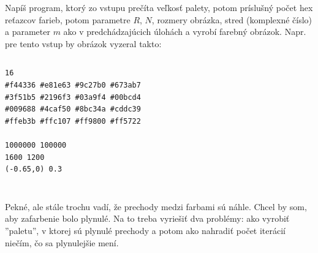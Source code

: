 \begin{uloha}
  Napíš program, ktorý zo vstupu prečíta veľkosť palety, potom príslušný počet
  hex reťazcov farieb, potom parametre $R$, $N$, rozmery obrázka, stred (komplexné
  číslo) a parameter $m$ ako v predchádzajúcich úlohách a vyrobí farebný obrázok.
  Napr. pre tento vstup by obrázok vyzeral takto:

  
\begin{column}{0.45}  
  \begin{Verbatim}
16
#f44336 #e81e63 #9c27b0 #673ab7
#3f51b5 #2196f3 #03a9f4 #00bcd4
#009688 #4caf50 #8bc34a #cddc39
#ffeb3b #ffc107 #ff9800 #ff5722

1000000 100000 
1600 1200 
(-0.65,0) 0.3
  \end{Verbatim}
\end{column}
  \hspace*{-5ex}
\begin{column}{0.45}
\vskip 0pt
  {
  \setlength{\fboxsep}{0pt}
  }\end{column}
\end{uloha}


Pekné, ale stále trochu vadí, že prechody medzi farbami sú náhle. Chcel by som, aby
zafarbenie bolo plynulé. Na to treba vyriešiť dva problémy: ako vyrobiť ''paletu'', v ktorej
sú plynulé prechody a potom ako nahradiť počet iterácií niečím, čo sa plynulejšie mení.



